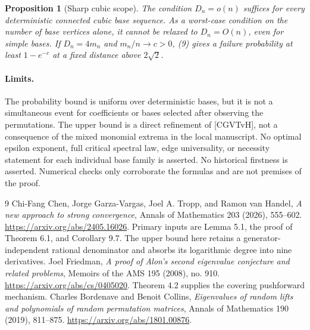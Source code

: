 \documentclass[11pt]{article}
\newtheorem{proposition}{Proposition}
\begin{document}
\begin{proposition}[Sharp cubic scope]
The condition $D_n=o(n)$ suffices for every deterministic connected cubic
base sequence. As a worst-case condition on the number of base vertices
alone, it cannot be relaxed to $D_n=O(n)$, even for simple bases. If
$D_n=4m_n$ and $m_n/n\to c>0$, (9) gives a failure probability at least
$1-e^{-c}$ at a fixed distance above $2\sqrt2$.
\end{proposition}

\paragraph{Limits.}
The probability bound is uniform over deterministic bases, but it is not
a simultaneous event for coefficients or bases selected after observing
the permutations. The upper bound is a direct refinement of [CGVTvH],
not a consequence of the mixed monomial extrema in the local manuscript.
No optimal epsilon exponent, full critical spectral law, edge universality,
or necessity statement for each individual base family is asserted.
No historical firstness is asserted. Numerical checks only corroborate
the formulas and are not premises of the proof.

\begin{thebibliography}{9}
Chi-Fang Chen, Jorge Garza-Vargas, Joel A. Tropp, and Ramon van Handel,
\emph{A new approach to strong convergence}, Annals of Mathematics 203
(2026), 555--602.
\url{https://arxiv.org/abs/2405.16026}.
Primary inputs are Lemma 5.1, the proof of Theorem 6.1, and Corollary 9.7.
The upper bound here retains a generator-independent rational denominator
and absorbs its logarithmic degree into nine derivatives.
Joel Friedman, \emph{A proof of Alon's second eigenvalue conjecture and
related problems}, Memoirs of the AMS 195 (2008), no. 910.
\url{https://arxiv.org/abs/cs/0405020}.
Theorem 4.2 supplies the covering pushforward mechanism.
Charles Bordenave and Benoit Collins,
\emph{Eigenvalues of random lifts and polynomials of random permutation
matrices}, Annals of Mathematics 190 (2019), 811--875.
\url{https://arxiv.org/abs/1801.00876}.
\end{thebibliography}
\end{document}

